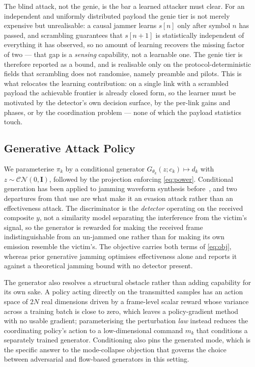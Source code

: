 The blind attack, not the genie, is the bar a learned attacker must clear.
For an independent and uniformly distributed payload the genie tier is not merely expensive but unrealisable: a causal jammer learns $s[n]$ only after symbol $n$ has passed, and scrambling guarantees that $s[n{+}1]$ is statistically independent of everything it has observed, so no amount of learning recovers the missing factor of two --- that gap is a \emph{sensing} capability, not a learnable one.
The genie tier is therefore reported as a bound, and is realisable only on the protocol-deterministic fields that scrambling does not randomise, namely preamble and pilots.
This is what relocates the learning contribution: on a single link with a scrambled payload the achievable frontier is already closed form, so the learner must be motivated by the detector's own decision surface, by the per-link gains and phases, or by the coordination problem --- none of which the payload statistics touch.

\subsection{Generative Attack Policy}
\label{sec:system:generator}

We parameterise $\pi_k$ by a conditional generator $G_{\theta_k}(z; c_k) \mapsto d_k$ with $z \sim \mathcal{CN}(0,\mathbf{I})$, followed by the projection enforcing \eqref{eq:power}.
Conditional generation has been applied to jamming waveform synthesis before~\cite{zhou2025cgan}, and two departures from that use are what make it an evasion attack rather than an effectiveness attack.
The discriminator is the \emph{detector} operating on the received composite $y$, not a similarity model separating the interference from the victim's signal, so the generator is rewarded for making the received frame indistinguishable from an un-jammed one rather than for making its own emission resemble the victim's.
The objective carries both terms of \eqref{eq:obj}, whereas prior generative jamming optimises effectiveness alone and reports it against a theoretical jamming bound with no detector present.

The generator also resolves a structural obstacle rather than adding capability for its own sake.
A policy acting directly on the transmitted samples has an action space of $2N$ real dimensions driven by a frame-level scalar reward whose variance across a training batch is close to zero, which leaves a policy-gradient method with no usable gradient; parameterising the perturbation \emph{law} instead reduces the coordinating policy's action to a low-dimensional command $m_k$ that conditions a separately trained generator.
Conditioning also pins the generated mode, which is the specific answer to the mode-collapse objection that governs the choice between adversarial and flow-based generators in this setting.

